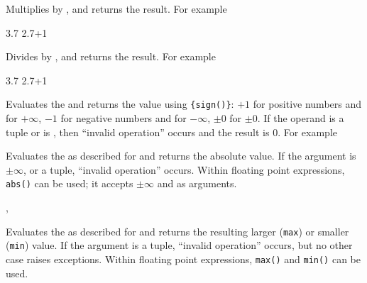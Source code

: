 \documentclass[oneside]{book}
\begin{document}
\begin{function}{\FpMathMult}
\begin{syntax}
  
\end{syntax}
Multiplies  by ,
and returns the result. For example
\begin{demohigh}
 {3.7}
 {2.7+1}
\end{demohigh}
\end{function}

\begin{function}{\FpMathDiv}
\begin{syntax}
  
\end{syntax}
Divides  by ,
and returns the result. For example
\begin{demohigh}
 {3.7}
 {2.7+1}
\end{demohigh}
\end{function}

\begin{function}{\FpMathSign}
\begin{syntax}
 
\end{syntax}
Evaluates the  and returns the value
using \verb|{sign(|\verb|)}|: $+1$ for positive
numbers and for $+\infty$, $-1$ for negative numbers and for
$-\infty$, $\pm 0$ for $\pm 0$.  If the operand is a tuple or is
\nan{}, then \enquote{invalid operation} occurs and the result
is $0$. For example
\begin{demohigh}
\end{demohigh}
\end{function}

\begin{function}{\FpMathAbs}
\begin{syntax}
 
\end{syntax}
Evaluates the  as described for
 and returns the absolute value.
If the argument is $\pm\infty$, \nan{} or a tuple,
\enquote{invalid operation} occurs.  Within floating point
expressions, \verb|abs()| can be used; it accepts $\pm\infty$ and \nan{}
as arguments.
\end{function}

\begin{function}{\FpMathMax,\FpMathMin}
\begin{syntax}
  
  
\end{syntax}
Evaluates the  as described for 
and returns the resulting larger (\texttt{max}) or smaller (\texttt{min}) value.
If the argument is a tuple, \enquote{invalid operation} occurs,
but no other case raises exceptions. Within floating point expressions,
\verb|max()| and \verb|min()| can be used.
\end{function}
\end{document}
